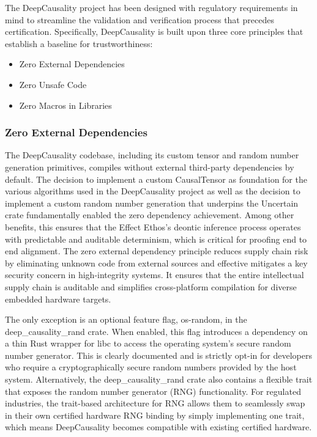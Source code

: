 The DeepCausality project has been designed with regulatory requirements in mind to streamline the validation and verification process that precedes certification. Specifically, DeepCausality is built upon three core principles that establish a baseline for trustworthiness:

\begin{itemize}
	\item Zero External Dependencies
	\item Zero Unsafe Code
	\item Zero Macros in Libraries
\end{itemize}

\subsubsection{Zero External Dependencies}

The DeepCausality codebase, including its custom tensor and random number generation primitives, compiles without external third-party dependencies by default. The decision to implement a custom CausalTensor as foundation for the various algorithms used in the DeepCausality project as well as the decision to implement a custom random number generation that underpins the Uncertain crate fundamentally enabled the zero dependency achievement. Among other benefits, this ensures that the Effect Ethos's deontic inference process operates with predictable and auditable determinism, which is critical for proofing end to end alignment. 
The zero external dependency principle reduces supply chain risk by eliminating unknown code from external sources and effective mitigates a key security concern in high-integrity systems. It ensures that the entire intellectual supply chain is auditable and simplifies cross-platform compilation for diverse embedded hardware targets.


The only exception is an optional feature flag, os-random, in the deep\_causality\_rand crate. When enabled, this flag introduces a dependency on a thin Rust wrapper for libc to access the operating system’s secure random number generator. This is clearly documented and is strictly opt-in for developers who require a cryptographically secure random numbers provided by the host system. Alternatively, the deep\_causality\_rand crate also contains a flexible trait that exposes the random number generator (RNG) functionality. For regulated industries, the trait-based architecture for RNG allows them to seamlessly swap in their own certified hardware RNG binding by simply implementing one trait, which means DeepCausality becomes compatible with  existing certified hardware. 

